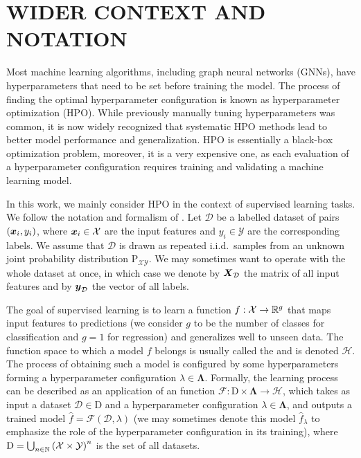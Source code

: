 \section{\uppercase{Wider context and Notation}}
\label{sec:context}

Most machine learning algorithms, including graph neural networks (GNNs), have hyperparameters that need to be set before training the model. The process of finding the optimal hyperparameter configuration is known as hyperparameter optimization (HPO). While previously manually tuning hyperparameters was common, it is now widely recognized that systematic HPO methods lead to better model performance and generalization. HPO is essentially a black-box optimization problem, moreover, it is a very expensive one, as each evaluation of a hyperparameter configuration requires training and validating a machine learning model.

In this work, we mainly consider HPO in the context of supervised learning tasks. We follow the notation and formalism of \cite{bischl_hyperparameter_2023}. Let \( \mathcal{D} \) be a labelled dataset of pairs \( \left( \boldsymbol{x}_i, y_i \right) \), where \( \boldsymbol{x}_i \in \mathcal{X} \) are the input features and \( y_i \in \mathcal{Y} \) are the corresponding labels. We assume that \( \mathcal{D} \) is drawn as repeated i.i.d.\ samples from an unknown joint probability distribution \( \mathrm{P}_{\mathcal{X}\mathcal{Y}} \). We may sometimes want to operate with the whole dataset at once, in which case we denote by \( \boldsymbol{X}_\mathcal{D} \) the matrix of all input features and by \( \boldsymbol{y}_\mathcal{D} \) the vector of all labels.

The goal of supervised learning is to learn a function \( f: \mathcal{X} \to \mathbb{R}^g \) that maps input features to predictions (we consider \( g \) to be the number of classes for classification and \( g = 1 \) for regression) and generalizes well to unseen data. The function space to which a model \( f \) belongs is usually called the  and is denoted \( \mathscr{H} \). The process of obtaining such a model is configured by some hyperparameters forming a hyperparameter configuration \( \lambda \in \boldsymbol\Lambda \). Formally, the learning process can be described as an application of an  function \( \mathscr{F} : \mathrm{D} \times \boldsymbol\Lambda \to \mathscr{H} \), which takes as input a dataset \( \mathcal{D} \in \mathrm{D} \) and a hyperparameter configuration \( \lambda \in \boldsymbol\Lambda \), and outputs a trained model \( \hat{f} = \mathscr{F} ( \mathcal{D}, \lambda ) \) (we may sometimes denote this model \( \hat{f}_\lambda \) to emphasize the role of the hyperparameter configuration in its training), where \( \mathrm{D} = \bigcup_{n \in \mathbb{N}} \left( \mathcal{X} \times \mathcal{Y} \right)^n \) is the set of all datasets.

